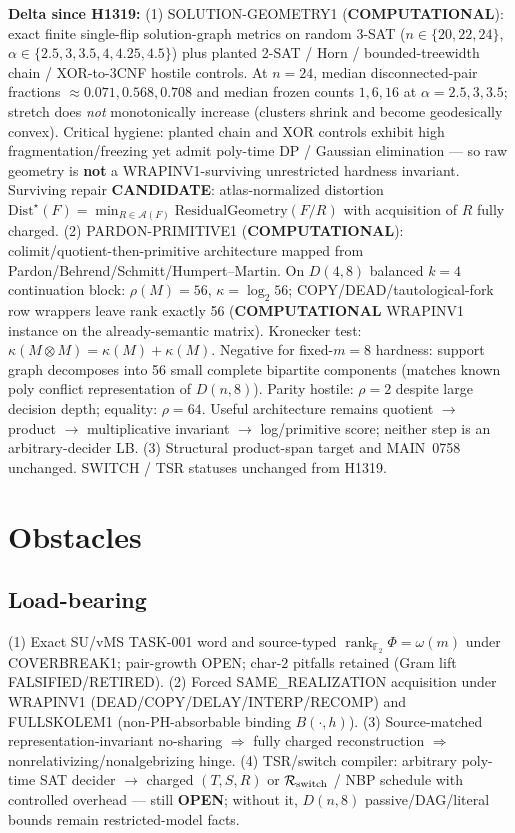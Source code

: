 \documentclass[11pt]{article}
\begin{document}
\textbf{Delta since H1319:}
(1) SOLUTION-GEOMETRY1 (\textbf{COMPUTATIONAL}): exact finite single-flip solution-graph
metrics on random 3-SAT ($n\in\{20,22,24\}$, $\alpha\in\{2.5,3,3.5,4,4.25,4.5\}$)
plus planted 2-SAT / Horn / bounded-treewidth chain / XOR-to-3CNF hostile controls.
At $n=24$, median disconnected-pair fractions $\approx 0.071,0.568,0.708$ and
median frozen counts $1,6,16$ at $\alpha=2.5,3,3.5$; stretch does \emph{not}
monotonically increase (clusters shrink and become geodesically convex).
Critical hygiene: planted chain and XOR controls exhibit high fragmentation/freezing
yet admit poly-time DP / Gaussian elimination --- so raw geometry is
\textbf{not} a WRAPINV1-surviving unrestricted hardness invariant.
Surviving repair \textbf{CANDIDATE}: atlas-normalized distortion
$\mathrm{Dist}^\star(F)=\min_{R\in\mathcal A(F)}\mathrm{ResidualGeometry}(F/R)$
with acquisition of $R$ fully charged.
(2) PARDON-PRIMITIVE1 (\textbf{COMPUTATIONAL}): colimit/quotient-then-primitive
architecture mapped from Pardon/Behrend/Schmitt/Humpert--Martin.
On $D(4,8)$ balanced $k=4$ continuation block: $\rho(M)=56$, $\kappa=\log_2 56$;
COPY/DEAD/tautological-fork row wrappers leave rank exactly 56
(\textbf{COMPUTATIONAL} WRAPINV1 instance on the already-semantic matrix).
Kronecker test: $\kappa(M\otimes M)=\kappa(M)+\kappa(M)$.
Negative for fixed-$m=8$ hardness: support graph decomposes into 56 small complete
bipartite components (matches known poly conflict representation of $D(n,8)$).
Parity hostile: $\rho=2$ despite large decision depth; equality: $\rho=64$.
Useful architecture remains quotient $\to$ product $\to$ multiplicative invariant $\to$
log/primitive score; neither step is an arbitrary-decider LB.
(3) Structural product-span target and MAIN~0758 unchanged.
SWITCH / TSR statuses unchanged from H1319.

\section*{Obstacles}
\subsection*{Load-bearing}
(1) Exact SU/vMS TASK-001 word and source-typed
$\operatorname{rank}_{\mathbb F_2}\Phi=\omega(m)$ under COVERBREAK1; pair-growth OPEN;
char-$2$ pitfalls retained (Gram lift FALSIFIED/RETIRED).
(2) Forced SAME\_REALIZATION acquisition under WRAPINV1
(DEAD/COPY/DELAY/INTERP/RECOMP) and FULLSKOLEM1 (non-PH-absorbable binding $B(\cdot,h)$).
(3) Source-matched representation-invariant no-sharing $\Rightarrow$ fully charged reconstruction
$\Rightarrow$ nonrelativizing/nonalgebrizing hinge.
(4) TSR/switch compiler: arbitrary poly-time SAT decider $\to$ charged $(T,S,R)$ or
$\mathcal R_{\rm switch}$ / NBP schedule with controlled overhead --- still \textbf{OPEN};
without it, $D(n,8)$ passive/DAG/literal bounds remain restricted-model facts.
\end{document}
